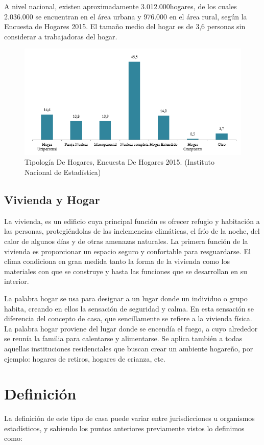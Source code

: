 \documentclass[11pt,letterpaper]{report}
\begin{document}
A nivel nacional, existen aproximadamente 3.012.000hogares, de los cuales 2.036.000 se encuentran en el área urbana y 976.000 en el área rural, según la Encuesta de Hogares 2015. El tamaño medio del hogar es de 3,6 personas sin considerar a trabajadoras del hogar\citep{bolivia2012instituto}.
		\begin{figure}[ht]
		\centering
		\includegraphics[scale=0.9]{imagenes/familia1.png}
		\caption{Tipología De Hogares, Encuesta De Hogares 2015. (Instituto Nacional de Estadística)}
		\label{ine} 
		\end{figure}
	\subsection{Vivienda y Hogar}
	La vivienda, es un edificio cuya principal función es ofrecer refugio y habitación a las personas, protegiéndolas de las inclemencias climáticas, el frío de la noche, del calor de algunos días y de otras amenazas naturales. La primera función de la vivienda es proporcionar un espacio seguro y confortable para resguardarse. El clima condiciona en gran medida tanto la forma de la vivienda como los materiales con que se construye y hasta las funciones que se desarrollan en su interior. 
	
La palabra hogar se usa para designar a un lugar donde un individuo o grupo habita, creando en ellos la sensación de seguridad y calma. En esta sensación se diferencia del concepto de casa, que sencillamente se refiere a la vivienda física. La palabra hogar proviene del lugar donde se encendía el fuego, a cuyo alrededor se reunía la familia para calentarse y alimentarse. Se aplica también a todas aquellas instituciones residenciales que buscan crear un ambiente hogareño, por ejemplo: hogares de retiros, hogares de crianza, etc.
	\section{Definición}
	La definición de este tipo de casa puede variar entre jurisdicciones u organismos estadísticos, y sabiendo los puntos anteriores previamente vistos lo definimos como:
	
\end{document}
